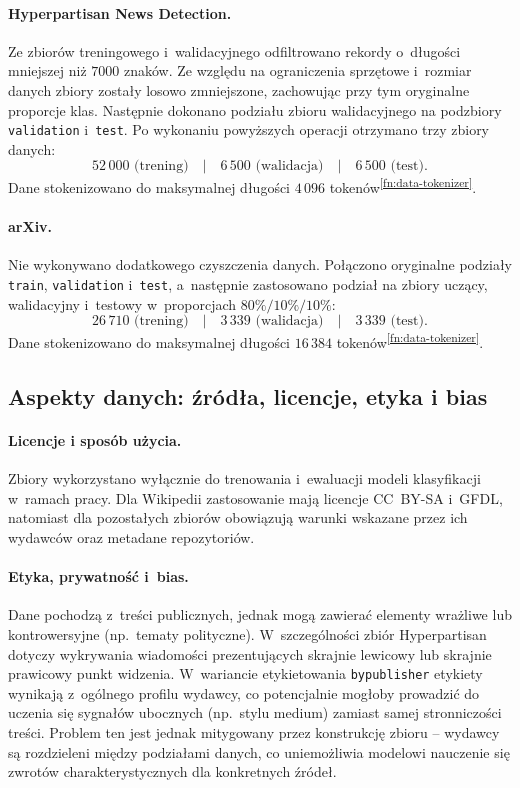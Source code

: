 \documentclass[a4paper,11pt,twoside]{report}
\theoremstyle{definition}
\begin{document}
\paragraph{Hyperpartisan News Detection.}
Ze zbiorów treningowego i~walidacyjnego odfiltrowano rekordy o~długości mniejszej niż $7000$ znaków. Ze względu na ograniczenia sprzętowe i~rozmiar danych zbiory zostały losowo zmniejszone, zachowując przy tym oryginalne proporcje klas. Następnie dokonano podziału zbioru walidacyjnego na podzbiory \texttt{validation} i~\texttt{test}. Po wykonaniu powyższych operacji otrzymano trzy zbiory danych:
\[
52\,000 \text{ (trening)} \quad|\quad 6\,500 \text{ (walidacja)} \quad|\quad 6\,500 \text{ (test)}.
\]
Dane stokenizowano do maksymalnej długości $4\,096$ tokenów\textsuperscript{\ref{fn:data-tokenizer}}.

\paragraph{arXiv.}
Nie wykonywano dodatkowego czyszczenia danych.
Połączono oryginalne podziały \texttt{train}, \texttt{validation} i~\texttt{test}, a~następnie zastosowano podział
na zbiory uczący, walidacyjny i~testowy w~proporcjach $80\%/10\%/10\%$:
\[
26\,710 \text{ (trening)} \quad|\quad 3\,339 \text{ (walidacja)} \quad|\quad 3\,339 \text{ (test)}.
\]
Dane stokenizowano do maksymalnej długości $16\,384$ tokenów\textsuperscript{\ref{fn:data-tokenizer}}.




\subsection{Aspekty danych: źródła, licencje, etyka i bias}
\label{sec:data_aspects}


\paragraph{Licencje i sposób użycia.}
Zbiory wykorzystano wyłącznie do trenowania i~ewaluacji modeli klasyfikacji w~ramach pracy. Dla Wikipedii zastosowanie mają licencje CC~BY-SA i~GFDL, natomiast dla pozostałych zbiorów obowiązują warunki wskazane przez ich wydawców oraz metadane repozytoriów.


\paragraph{Etyka, prywatność i~bias.}
Dane pochodzą z~treści publicznych, jednak mogą zawierać elementy wrażliwe lub kontrowersyjne (np.\ tematy polityczne).
W~szczególności zbiór Hyperpartisan dotyczy wykrywania wiadomości prezentujących skrajnie lewicowy lub skrajnie prawicowy punkt widzenia. W~wariancie etykietowania \texttt{bypublisher} etykiety wynikają z~ogólnego profilu wydawcy, co potencjalnie mogłoby prowadzić do uczenia się sygnałów ubocznych (np.\ stylu medium) zamiast samej stronniczości treści. Problem ten jest jednak mitygowany przez konstrukcję zbioru -- wydawcy są rozdzieleni między podziałami danych, co uniemożliwia modelowi nauczenie się zwrotów charakterystycznych dla konkretnych źródeł.
\end{document}
